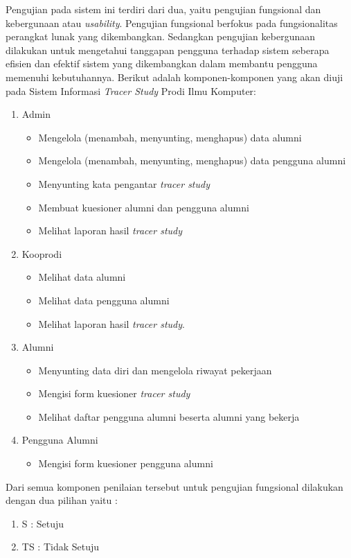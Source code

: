 Pengujian pada sistem ini terdiri dari dua, yaitu pengujian fungsional dan kebergunaan atau \textit{usability}. Pengujian fungsional berfokus pada fungsionalitas perangkat lunak yang dikembangkan. Sedangkan pengujian kebergunaan dilakukan untuk mengetahui tanggapan pengguna terhadap sistem seberapa efisien dan efektif sistem yang dikembangkan dalam membantu pengguna memenuhi kebutuhannya. Berikut adalah komponen-komponen yang akan diuji pada Sistem Informasi \textit{Tracer Study} Prodi Ilmu Komputer:

\begin{enumerate}
	\item Admin
	\begin{itemize}
		\item Mengelola (menambah, menyunting, menghapus) data alumni
		\item Mengelola (menambah, menyunting, menghapus) data pengguna alumni
		\item Menyunting kata pengantar \textit{tracer study}
		\item Membuat kuesioner alumni dan pengguna alumni
		\item Melihat laporan hasil \textit{tracer study}
	\end{itemize}
	\item Kooprodi
	\begin{itemize}
		\item Melihat data alumni
		\item Melihat data pengguna alumni
		\item Melihat laporan hasil \textit{tracer study}. 
	\end{itemize} 
	\item Alumni
	\begin{itemize}
		\item Menyunting data diri dan mengelola riwayat pekerjaan
		\item Mengisi form kuesioner \textit{tracer study}
		\item Melihat daftar pengguna alumni beserta alumni yang bekerja
	\end{itemize} 
	\item Pengguna Alumni
	 \begin{itemize}
	 	\item Mengisi form kuesioner pengguna alumni
	 \end{itemize}
\end{enumerate}
Dari semua komponen penilaian tersebut untuk pengujian fungsional dilakukan
dengan dua pilihan yaitu :
\begin{enumerate}
	\item S  : Setuju
	\item TS : Tidak Setuju
\end{enumerate}
